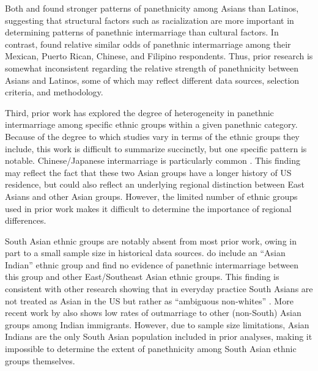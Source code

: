 \documentclass[11pt,]{article}
\begin{document}
Both \citet{rosenfeld_salience_2001} and \citet{fu_how_2007a} found stronger patterns of panethnicity among Asians than Latinos, suggesting that structural factors such as racialization are more important in determining patterns of panethnic intermarriage than cultural factors. In contrast, \citet{qian_crossing_2012} found relative similar odds of panethnic intermarriage among their Mexican, Puerto Rican, Chinese, and Filipino respondents. Thus, prior research is somewhat inconsistent regarding the relative strength of panethnicity between Asians and Latinos, some of which may reflect different data sources, selection criteria, and methodology.

Third, prior work has explored the degree of heterogeneity in panethnic intermarriage among specific ethnic groups within a given panethnic category. Because of the degree to which studies vary in terms of the ethnic groups they include, this work is difficult to summarize succinctly, but one specific pattern is notable. Chinese/Japanese intermarriage is particularly common \citep{qian_asian_2001, rosenfeld_salience_2001}. This finding may reflect the fact that these two Asian groups have a longer history of US residence, but could also reflect an underlying regional distinction between East Asians and other Asian groups. However, the limited number of ethnic groups used in prior work makes it difficult to determine the importance of regional differences.

South Asian ethnic groups are notably absent from most prior work, owing in part to a small sample size in historical data sources. \citet{qian_asian_2001} do include an ``Asian Indian'' ethnic group and find no evidence of panethnic intermarriage between this group and other East/Southeast Asian ethnic groups. This finding is consistent with other research showing that in everyday practice South Asians are not treated as Asian in the US but rather as ``ambiguous non-whites'' \citep{kibria_not_1996, morning_racial_2001, schachter_finding_2014}. More recent work by \citet{lichter_whom_2015a} also shows low rates of outmarriage to other (non-South) Asian groups among Indian immigrants. However, due to sample size limitations, Asian Indians are the only South Asian population included in prior analyses, making it impossible to determine the extent of panethnicity among South Asian ethnic groups themselves.
\end{document}
